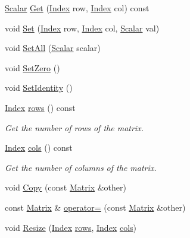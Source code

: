 \begin{DoxyCompactItemize}
\item 
\hyperlink{typedefs_8h_a508fc58b5dc3c81865305f6498457063}{Scalar} \hyperlink{classgsl_1_1_matrix_a297617ec0562e5f0a74acd0c07a3b6aa}{Get} (\hyperlink{typedefs_8h_a5d7deb06d9443e7d4a47bf078638cc91}{Index} row, \hyperlink{typedefs_8h_a5d7deb06d9443e7d4a47bf078638cc91}{Index} col) const 
\item 
void \hyperlink{classgsl_1_1_matrix_acf6d1790e1400d0550a29edcae9b06a7}{Set} (\hyperlink{typedefs_8h_a5d7deb06d9443e7d4a47bf078638cc91}{Index} row, \hyperlink{typedefs_8h_a5d7deb06d9443e7d4a47bf078638cc91}{Index} col, \hyperlink{typedefs_8h_a508fc58b5dc3c81865305f6498457063}{Scalar} val)
\item 
void \hyperlink{classgsl_1_1_matrix_ab74d4d03d784fc835ff31be3a90f6b75}{Set\+All} (\hyperlink{typedefs_8h_a508fc58b5dc3c81865305f6498457063}{Scalar} scalar)
\item 
void \hyperlink{classgsl_1_1_matrix_aa8736a0de07b25698e8c1d501cbce00a}{Set\+Zero} ()
\item 
void \hyperlink{classgsl_1_1_matrix_ad92a4b03c7d5b2e348ee72b54737165c}{Set\+Identity} ()
\item 
\hyperlink{typedefs_8h_a5d7deb06d9443e7d4a47bf078638cc91}{Index} \hyperlink{classgsl_1_1_matrix_a459c986967f558d242020a7d6c5feb0b}{rows} () const 
\begin{DoxyCompactList}\small\item\em Get the number of rows of the matrix. \end{DoxyCompactList}\item 
\hyperlink{typedefs_8h_a5d7deb06d9443e7d4a47bf078638cc91}{Index} \hyperlink{classgsl_1_1_matrix_a19034005cec347cd9e3879c06f59b4eb}{cols} () const 
\begin{DoxyCompactList}\small\item\em Get the number of columns of the matrix. \end{DoxyCompactList}\item 
void \hyperlink{classgsl_1_1_matrix_adb9e90c5ed48a636505fb316f80edcea}{Copy} (const \hyperlink{classgsl_1_1_matrix}{Matrix} \&other)
\item 
const \hyperlink{classgsl_1_1_matrix}{Matrix} \& \hyperlink{classgsl_1_1_matrix_a27932a4c42807a3987979db7fa699023}{operator=} (const \hyperlink{classgsl_1_1_matrix}{Matrix} \&other)
\item 
void \hyperlink{classgsl_1_1_matrix_a96a76a573e0af24b18eac7177b13038c}{Resize} (\hyperlink{typedefs_8h_a5d7deb06d9443e7d4a47bf078638cc91}{Index} \hyperlink{classgsl_1_1_matrix_a459c986967f558d242020a7d6c5feb0b}{rows}, \hyperlink{typedefs_8h_a5d7deb06d9443e7d4a47bf078638cc91}{Index} \hyperlink{classgsl_1_1_matrix_a19034005cec347cd9e3879c06f59b4eb}{cols})

\end{DoxyCompactItemize}
